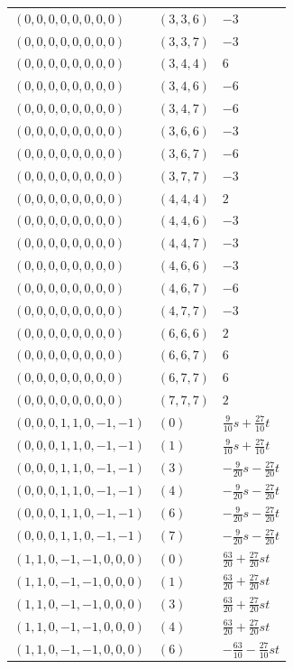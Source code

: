 \begin{longtable}{@{}lll@{}}
$(0,0,0,0,0,0,0,0)$ & $(3,3,6)$ & $-3$\\
$(0,0,0,0,0,0,0,0)$ & $(3,3,7)$ & $-3$\\
$(0,0,0,0,0,0,0,0)$ & $(3,4,4)$ & $6$\\
$(0,0,0,0,0,0,0,0)$ & $(3,4,6)$ & $-6$\\
$(0,0,0,0,0,0,0,0)$ & $(3,4,7)$ & $-6$\\
$(0,0,0,0,0,0,0,0)$ & $(3,6,6)$ & $-3$\\
$(0,0,0,0,0,0,0,0)$ & $(3,6,7)$ & $-6$\\
$(0,0,0,0,0,0,0,0)$ & $(3,7,7)$ & $-3$\\
$(0,0,0,0,0,0,0,0)$ & $(4,4,4)$ & $2$\\
$(0,0,0,0,0,0,0,0)$ & $(4,4,6)$ & $-3$\\
$(0,0,0,0,0,0,0,0)$ & $(4,4,7)$ & $-3$\\
$(0,0,0,0,0,0,0,0)$ & $(4,6,6)$ & $-3$\\
$(0,0,0,0,0,0,0,0)$ & $(4,6,7)$ & $-6$\\
$(0,0,0,0,0,0,0,0)$ & $(4,7,7)$ & $-3$\\
$(0,0,0,0,0,0,0,0)$ & $(6,6,6)$ & $2$\\
$(0,0,0,0,0,0,0,0)$ & $(6,6,7)$ & $6$\\
$(0,0,0,0,0,0,0,0)$ & $(6,7,7)$ & $6$\\
$(0,0,0,0,0,0,0,0)$ & $(7,7,7)$ & $2$\\
$(0,0,0,1,1,0,-1,-1)$ & $(0)$ & $\frac{9}{10}s+\frac{27}{10}t$\\
$(0,0,0,1,1,0,-1,-1)$ & $(1)$ & $\frac{9}{10}s+\frac{27}{10}t$\\
$(0,0,0,1,1,0,-1,-1)$ & $(3)$ & $-\frac{9}{20}s-\frac{27}{20}t$\\
$(0,0,0,1,1,0,-1,-1)$ & $(4)$ & $-\frac{9}{20}s-\frac{27}{20}t$\\
$(0,0,0,1,1,0,-1,-1)$ & $(6)$ & $-\frac{9}{20}s-\frac{27}{20}t$\\
$(0,0,0,1,1,0,-1,-1)$ & $(7)$ & $-\frac{9}{20}s-\frac{27}{20}t$\\
$(1,1,0,-1,-1,0,0,0)$ & $(0)$ & $\frac{63}{20}+\frac{27}{20}st$\\
$(1,1,0,-1,-1,0,0,0)$ & $(1)$ & $\frac{63}{20}+\frac{27}{20}st$\\
$(1,1,0,-1,-1,0,0,0)$ & $(3)$ & $\frac{63}{20}+\frac{27}{20}st$\\
$(1,1,0,-1,-1,0,0,0)$ & $(4)$ & $\frac{63}{20}+\frac{27}{20}st$\\
$(1,1,0,-1,-1,0,0,0)$ & $(6)$ & $-\frac{63}{10}-\frac{27}{10}st$\\

\end{longtable}
